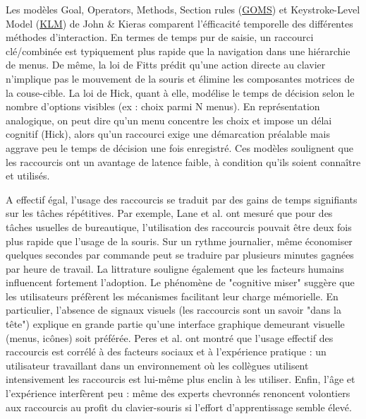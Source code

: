 \documentclass[a4paper,12pt]{article}
\begin{document}
Les modèles Goal, Operators, Methods, Section rules
 (\protect\hyperlink{gls-3}{\label{gls-3-use-1}GOMS}) et Keystroke-Level Model
 (\protect\hyperlink{gls-4}{\label{gls-4-use-1}KLM}) de John \& Kieras comparent l'éfficacité temporelle des différentes méthodes d'interaction. En termes de temps pur de saisie, un raccourci clé/combinée est typiquement plus rapide que la navigation dans une hiérarchie de menus\autocite{peresKeyboardShortcutUsage2004}. De même, la loi de Fitts prédit qu'une action directe au clavier n'implique pas le mouvement de la souris et élimine les composantes motrices de la couse-cible. La loi de Hick, quant à elle, modélise le temps de décision selon le nombre d'options visibles (ex : choix parmi N menus). En représentation analogique, on peut dire qu'un menu concentre les choix et impose un délai cognitif (Hick), alors qu'un raccourci exige une démarcation préalable mais aggrave peu le temps de décision une fois enregistré. Ces modèles soulignent que les raccourcis ont un avantage de latence faible, à condition qu'ils soient connaître et utilisés.

A effectif égal, l'usage des raccourcis se traduit par des gains de temps signifiants sur les tâches répétitives. Par exemple, Lane et al. ont mesuré que pour des tâches usuelles de bureautique, l'utilisation des raccourcis pouvait être deux fois plus rapide que l'usage de la souris\autocite{peresKeyboardShortcutUsage2004}. Sur un rythme journalier, même économiser quelques secondes par commande peut se traduire par plusieurs minutes gagnées par heure de travail\autocite{peresKeyboardShortcutUsage2004}. La littrature souligne également que les facteurs humains influencent fortement l'adoption. Le phénomène de "cognitive miser" suggère que les utilisateurs préfèrent les mécanismes facilitant leur charge mémorielle\autocite{peresKeyboardShortcutUsage2004}. En particulier, l'absence de signaux visuels (les raccourcis sont un savoir "dans la tête") explique en grande partie qu'une interface graphique demeurant visuelle (menus, icônes) soit préférée\autocite{peresKeyboardShortcutUsage2004}. Peres et al. ont montré que l'usage effectif des raccourcis est corrélé à des facteurs sociaux et à l'expérience pratique : un utilisateur travaillant dans un environnement où les collègues utilisent intensivement les raccourcis est lui-même plus enclin à les utiliser\autocite{peresKeyboardShortcutUsage2004}. Enfin, l'âge et l'expérience interfèrent peu : même des experts chevronnés renoncent volontiers aux raccourcis au profit du clavier-souris si l'effort d'apprentissage semble élevé\autocite{peresKeyboardShortcutUsage2004,raursoIntermodalImprovementNudging2020}.
\end{document}
